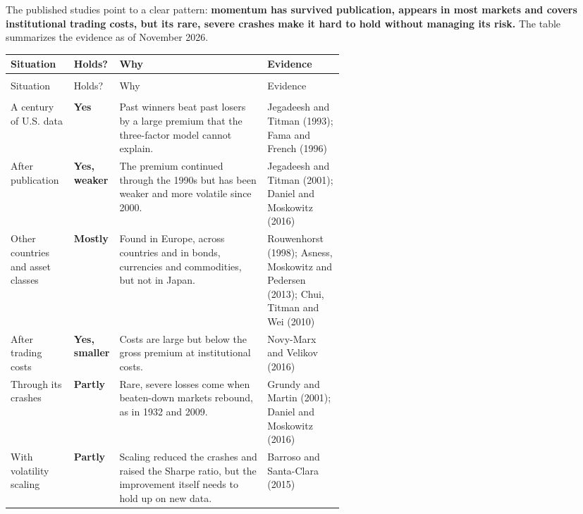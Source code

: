 The published studies point to a clear pattern: \textbf{momentum has survived publication, appears in most markets and covers institutional trading costs, but its rare, severe crashes make it hard to hold without managing its risk.} The table summarizes the evidence as of November 2026.

\begingroup
\small
\setlength{\LTpre}{6pt}\setlength{\LTpost}{6pt}
\begin{longtable}{@{}>{\raggedright\arraybackslash}p{0.19\linewidth}>{\raggedright\arraybackslash}p{0.13\linewidth}>{\raggedright\arraybackslash}p{}>{\raggedright\arraybackslash}p{0.23\linewidth}@{}}
\toprule
Situation & Holds? & Why & Evidence \\
\midrule
\endfirsthead
\multicolumn{4}{@{}l}{\emph{(continued)}} \\
\toprule
Situation & Holds? & Why & Evidence \\
\midrule
\endhead
\midrule
\multicolumn{4}{r@{}}{\emph{(continued on the next page)}} \\
\endfoot
\bottomrule
\endlastfoot
A century of U.S. data & \textbf{Yes} & Past winners beat past losers by a large premium that the three-factor model cannot explain. & Jegadeesh and Titman (1993); Fama and French (1996) \\*
\addlinespace[3pt]
After publication & \textbf{Yes, weaker} & The premium continued through the 1990s but has been weaker and more volatile since 2000. & Jegadeesh and Titman (2001); Daniel and Moskowitz (2016) \\
\addlinespace[3pt]
Other countries and asset classes & \textbf{Mostly} & Found in Europe, across countries and in bonds, currencies and commodities, but not in Japan. & Rouwenhorst (1998); Asness, Moskowitz and Pedersen (2013); Chui, Titman and Wei (2010) \\
\addlinespace[3pt]
After trading costs & \textbf{Yes, smaller} & Costs are large but below the gross premium at institutional costs. & Novy-Marx and Velikov (2016) \\
\addlinespace[3pt]
Through its crashes & \textbf{Partly} & Rare, severe losses come when beaten-down markets rebound, as in 1932 and 2009. & Grundy and Martin (2001); Daniel and Moskowitz (2016) \\*
\addlinespace[3pt]
With volatility scaling & \textbf{Partly} & Scaling reduced the crashes and raised the Sharpe ratio, but the improvement itself needs to hold up on new data. & Barroso and Santa-Clara (2015) \\
\end{longtable}
\addtocounter{table}{-1}%
\endgroup

